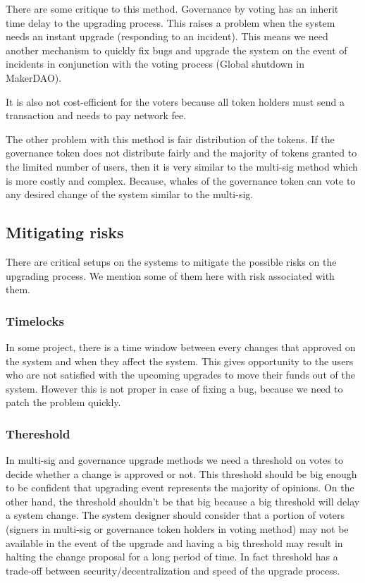 There are some critique to this method. Governance by voting has an inherit time delay to the upgrading process. This raises a problem when the system needs an instant upgrade (\eg responding to an incident). This means we need another mechanism to quickly fix bugs and upgrade the system on the event of incidents in conjunction with the voting process (\eg Global shutdown in MakerDAO).

It is also not cost-efficient for the voters because all token holders must send a transaction and needs to pay network fee.

The other problem with this method is fair distribution of the tokens. If the governance token does not distribute fairly and the majority of tokens granted to the limited number of users, then it is very similar to the multi-sig method which is more costly and complex. Because, whales of the governance token can vote to any desired change of the system similar to the multi-sig.
 

\subsection{Mitigating risks}
There are critical setups on the systems to mitigate the possible risks on the upgrading process. We mention some of them here with risk associated with them.

\subsubsection{Timelocks}
In some project, there is a time window between every changes that approved on the system and when they affect the system. This gives opportunity to the users who are not satisfied with the upcoming upgrades to move their funds out of the system. However this is not proper in case of fixing a bug, because we need to patch the problem quickly.

\subsubsection{Thereshold}
In multi-sig and governance upgrade methods we need a threshold on votes to decide whether a change is approved or not. This threshold should be big enough to be confident that upgrading event represents the majority of opinions. On the other hand, the threshold shouldn't be that big because a big threshold will delay a system change. The system designer should consider that a portion of voters (signers in multi-sig or governance token holders in voting method) may not be available in the event of the upgrade and having a big threshold may result in halting the change proposal for a long period of time. In fact threshold has a trade-off between security/decentralization and speed of the upgrade process.

